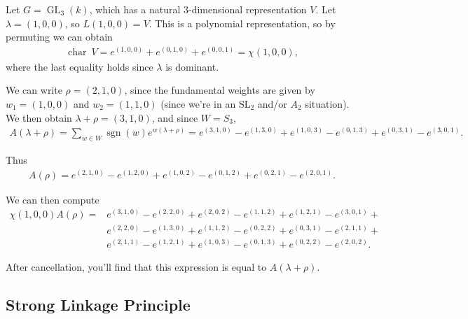 \begin{example}

\begin{example}

Let \(G = \operatorname{GL}_3(k)\), which has a natural 3-dimensional
representation \(V\). Let \(\lambda = (1,0,0)\), so \(L(1,0,0) = V\).
This is a polynomial representation, so by permuting we can obtain
\begin{align*}   \operatorname{char}~V = e^{(1,0,0)} + e^{(0,1,0)} + e^{(0,0,1)} = \chi(1,0,0) ,\end{align*}
where the last equality holds since \(\lambda\) is dominant.

We can write \(\rho = (2,1,0)\), since the fundamental weights are given
by \(w_1 = (1,0,0)\) and \(w_2 = (1,1,0)\) (since we're in an
\({\text{SL}}_2\) and/or \(A_2\) situation). We then obtain
\(\lambda + \rho = (3,1,0)\), and since \(W= S_3\),
\begin{align*}   A(\lambda + \rho) = \sum_{w\in W} \operatorname{sgn}(w) e^{w(\lambda + \rho)} = e^{(3,1,0)} - e^{(1,3,0)} +  e^{(1,0,3)} -  e^{(0,1,3)} +  e^{(0,3,1)} -  e^{(3,0,1)} .\end{align*}

Thus
\begin{align*}   A(\rho) = e^{(2,1,0)} - e^{(1,2,0)} +  e^{(1,0,2)} -  e^{(0,1,2)} +  e^{(0,2,1)} -  e^{(2,0,1)} .\end{align*}

We can then compute
\begin{align*}   \chi(1,0,0) A(\rho) = &e^{(3,1,0)} - e^{(2,2,0)} +  e^{(2,0,2)}  -e^{(1,1,2)} +  e^{(1,2,1)} - e^{(3,0,1)} +  \\ &e^{(2,2,0)} - e^{(1,3,0)} +  e^{(1,1,2)} -  e^{(0,2,2)} +  e^{(0,3,1)} -  e^{(2,1,1)} +  \\ &e^{(2,1,1)} - e^{(1,2,1)} +  e^{(1,0,3)} -  e^{(0,1,3)} +  e^{(0,2,2)} -  e^{(2,0,2)} .\end{align*}

After cancellation, you'll find that this expression is equal to
\(A(\lambda + \rho)\).

\end{example}

\end{example}

\hypertarget{strong-linkage-principle}{%
\subsection{Strong Linkage Principle}\label{strong-linkage-principle}}


